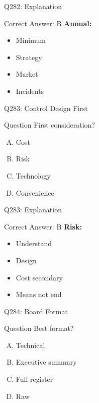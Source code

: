 \documentclass{beamer}
\begin{document}
	\begin{frame}{Q282: Explanation}
		\begin{block}{Correct Answer: B}
			\textbf{Annual:}
			\begin{itemize}
				\item Minimum
				\item Strategy
				\item Market
				\item Incidents
			\end{itemize}
		\end{block}
	\end{frame}
	
	\begin{frame}{Q283: Control Design First}
		\begin{block}{Question}
			First consideration?
		\end{block}
		\begin{enumerate}[(A)]
			\item Cost
			\item Risk
			\item Technology
			\item Convenience
		\end{enumerate}
	\end{frame}
	
	\begin{frame}{Q283: Explanation}
		\begin{block}{Correct Answer: B}
			\textbf{Risk:}
			\begin{itemize}
				\item Understand
				\item Design
				\item Cost secondary
				\item Means not end
			\end{itemize}
		\end{block}
	\end{frame}
	
	\begin{frame}{Q284: Board Format}
		\begin{block}{Question}
			Best format?
		\end{block}
		\begin{enumerate}[(A)]
			\item Technical
			\item Executive summary
			\item Full register
			\item Raw
		\end{enumerate}
	\end{frame}
	
\end{document}
